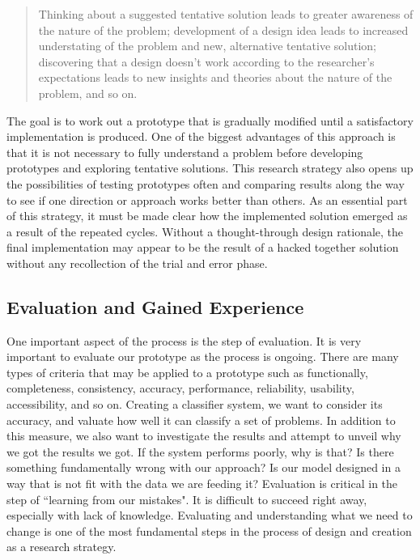 \begin{quote}
    Thinking about a suggested tentative solution leads to greater awareness of the nature of the problem; development of a design idea leads to increased understating of the problem and new, alternative tentative solution; discovering that a design doesn't work according to the researcher's expectations leads to new insights and theories about the nature of the problem, and so on. 
\end{quote}

The goal is to work out a prototype that is gradually modified until a satisfactory implementation is produced. One of the biggest advantages of this approach is that it is not necessary to fully understand a problem before developing prototypes and exploring tentative solutions. This research strategy also opens up the possibilities of testing prototypes often and comparing results along the way to see if one direction or approach works better than others. As an essential part of this strategy, it must be made clear how the implemented solution emerged as a result of the repeated cycles. Without a thought-through design rationale, the final implementation may appear to be the result of a hacked together solution without any recollection of the trial and error phase.

\subsection{Evaluation and Gained Experience}
\label{sec:evaluation_and_gained_experience}
One important aspect of the process is the step of evaluation. It is very important to evaluate our prototype as the process is ongoing. There are many types of criteria that may be applied to a prototype such as functionally, completeness, consistency, accuracy, performance, reliability, usability, accessibility, and so on. Creating a classifier system, we want to consider its accuracy, and valuate how well it can classify a set of problems. In addition to this measure, we also want to investigate the results and attempt to unveil why we got the results we got. If the system performs poorly, why is that? Is there something fundamentally wrong with our approach? Is our model designed in a way that is not fit with the data we are feeding it? Evaluation is critical in the step of ``learning from our mistakes". It is difficult to succeed right away, especially with lack of knowledge. Evaluating and understanding what we need to change is one of the most fundamental steps in the process of design and creation as a research strategy.

